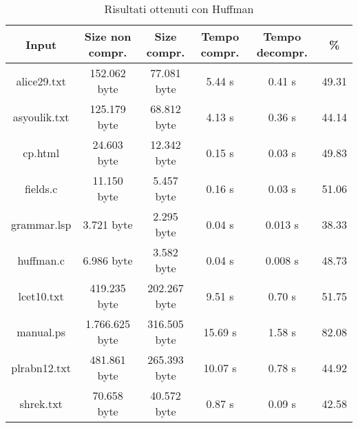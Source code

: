     \begin{table}
    \begin{tabular}{||c c c c c c||} 
     \hline
     Input & Size non compr. & Size compr. & Tempo compr. & Tempo decompr. & \% \\ [0.5ex] 
     \hline\hline
     alice29.txt & 152.062 byte & 77.081 byte & 5.44 s & 0.41 s & 49.31\\ [1ex]
     \hline
     asyoulik.txt & 125.179 byte & 68.812 byte & 4.13 s & 0.36 s & 44.14\\ [1ex] 
     \hline
     cp.html & 24.603 byte & 12.342 byte & 0.15 s & 0.03 s & 49.83\\ [1ex] 
     \hline
     fields.c & 11.150 byte & 5.457 byte & 0.16 s & 0.03 s & 51.06\\ [1ex]
     \hline
     grammar.lsp & 3.721 byte & 2.295 byte & 0.04 s & 0.013 s & 38.33\\ [1ex] 
     \hline
     huffman.c & 6.986 byte & 3.582 byte & 0.04 s & 0.008 s & 48.73\\ [1ex]
     \hline
     lcet10.txt & 419.235 byte & 202.267 byte & 9.51 s & 0.70 s & 51.75\\ [1ex] 
     \hline
     manual.ps & 1.766.625 byte & 316.505 byte & 15.69 s & 1.58 s & 82.08\\ 
 [1ex]
     \hline
     plrabn12.txt & 481.861 byte & 265.393 byte & 10.07 s & 0.78 s & 44.92\\ [1ex] 
     \hline
     shrek.txt & 70.658 byte & 40.572 byte & 0.87 s & 0.09 s & 42.58\\ [1ex]

     \hline
    \end{tabular} 
    \caption{Risultati ottenuti con Huffman\label{tab:huffman}}
    \end{table}
